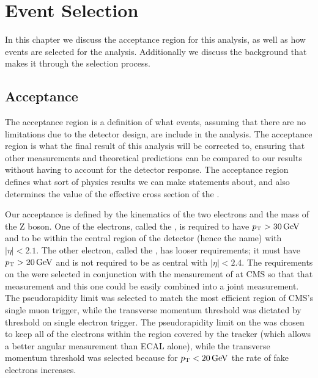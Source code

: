 \chapter{Event Selection}
\label{event_selection_chapter}

In this chapter we discuss the acceptance region for this analysis, as well as
how events are selected for the analysis. Additionally we discuss the
background that makes it through the selection process.

\section{Acceptance}
\label{sec:acceptance}

The acceptance region is a definition of what events, assuming that there are
no limitations due to the detector design, are include in the analysis. The
acceptance region is what the final result of this analysis will be corrected
to, ensuring that other measurements and theoretical predictions can be
compared to our results without having to account for the detector response.
The acceptance region defines what sort of physics results we can make
statements about, and also determines the value of the effective cross section
of the \Z.

Our acceptance is defined by the kinematics of the two electrons and the mass
of the Z boson. One of the electrons, called the \CentralElectron, is required
to have $p_{\mathrm{T}} > 30 \,\text{Ge\hspace{-.08em}V}$ and to be within the central region of the detector
(hence the name) with $|\eta| < 2.1$. The other electron, called the
\ExtendedElectron, has looser requirements; it must have $p_{\mathrm{T}} > 20 \,\text{Ge\hspace{-.08em}V}$ and is
not required to be as central with $|\eta| < 2.4$. The requirements on the
\CentralElectron were selected in conjunction with the \Ztomumu measurement of
\phistar at CMS so that that measurement and this one could be easily combined
into a joint measurement. The pseudorapidity limit was selected to match the
most efficient region of CMS's single muon trigger, while the transverse
momentum threshold was dictated by threshold on single electron trigger. The
pseudorapidity limit on the \ExtendedElectron was chosen to keep all of the
electrons within the region covered by the tracker (which allows a better
angular measurement than ECAL alone), while the transverse momentum threshold
was selected because for $p_{\mathrm{T}} < 20 \,\text{Ge\hspace{-.08em}V}$ the rate of fake electrons increases.

